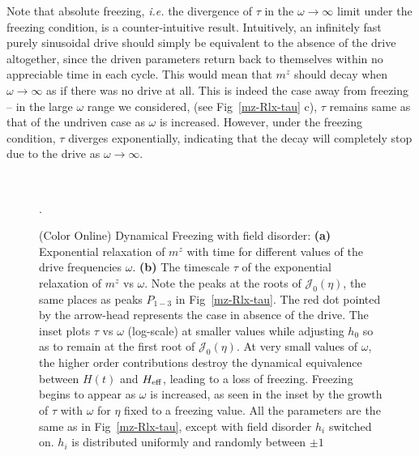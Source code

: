 \documentclass[reprint,preprintnumbers,showpacs,amsmath,twocolumn,showkeys,aps,prl]{revtex4-1}
\begin{document}
Note that absolute 
freezing, \textit{i.e.} the divergence of $\tau$ in the $\omega \to \infty$ limit 
under the freezing condition, is a counter-intuitive result. Intuitively, an infinitely 
fast purely sinusoidal drive should simply be equivalent to the absence of the drive altogether, 
since the driven parameters return back to themselves within no appreciable time in each cycle. 
This would mean that $m^z$ should decay when $\omega \to \infty$ 
as if there was no drive at all. This is indeed the case away from freezing -- in the large $\omega$
range we considered, (see Fig~\ref{mz-Rlx-tau} c), $\tau$ remains same 
as that of the undriven case as $\omega$ is increased. However, 
under the freezing condition, $\tau$ diverges exponentially, indicating that the decay will completely
stop due to the drive as $\omega \to \infty$. \\
\begin{figure*}[t]
\ 
\caption{
(Color Online) Dynamical Freezing with field disorder:  
{\bf (a)} Exponential relaxation of $m^{z}$ with time for different
values of the drive frequencies $\omega$. {\bf (b)} 
The timescale $\tau$ of the exponential relaxation of $m^z$ vs $\omega$. 
Note the peaks at the roots of $\mathcal{J}_0(\eta)$, the same places as peaks 
$P_{1-3}$ in Fig~\ref{mz-Rlx-tau}. The red dot pointed by the arrow-head represents 
the case in absence of the drive. The inset plots $\tau$ vs $\omega$ (log-scale) at 
smaller values while adjusting $h_0$ so as to remain at the first root of  $\mathcal{J}_0(\eta)$. 
At very small values of $\omega$, the higher order contributions destroy the dynamical 
equivalence between $H(t)$ and $H_{\rm eff}$, leading to a loss of freezing. 
Freezing begins to appear as $\omega$ is increased, as seen in the inset by the growth of $\tau$ with $\omega$
for $\eta$ fixed to a freezing value. All the parameters are the same 
as in Fig~\ref{mz-Rlx-tau}, except with field disorder $h_i$ switched on.
$h_{i}$ is distributed uniformly and randomly between $\pm 1$}. 
\label{mz-Rlx-tau-fdon}
\end{figure*}
\end{document}

